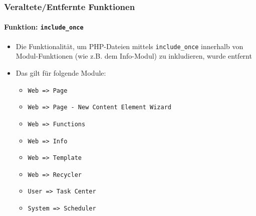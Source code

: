 
\begin{frame}[fragile]
	\frametitle{Veraltete/Entfernte Funktionen}
	\framesubtitle{Funktion: \texttt{include\_once}}

	\begin{itemize}

		\item Die Funktionalität, um PHP-Dateien mittels \texttt{include\_once}
			innerhalb von Modul-Funktionen (wie z.B. dem Info-Modul) zu inkludieren,
			wurde entfernt

		\item Das gilt für folgende Module:

			\begin{itemize}
				\item \texttt{Web => Page}
				\item \texttt{Web => Page - New Content Element Wizard}
				\item \texttt{Web => Functions}
				\item \texttt{Web => Info}
				\item \texttt{Web => Template}
				\item \texttt{Web => Recycler}
				\item \texttt{User => Task Center}
				\item \texttt{System => Scheduler}
			\end{itemize}

	\end{itemize}

\end{frame}


